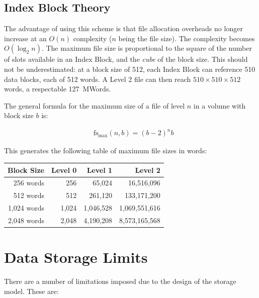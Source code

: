 \subsection{Index Block Theory}
\label{sec:index-block-theory}

The advantage of using this scheme is that file allocation overheads
no longer increase at an $O(n)$ complexity ($n$ being the file
size). The complexity becomes $O(\log_2 n)$. The maximum file size is
proportional to the square of the number of slots available in an
Index Block, and the {\em cube\/} of the block size. This should not
be underestimated: at a block size of 512, each Index Block can
reference 510 data blocks, each of 512 words. A Level 2 file can then
reach $510×510×512$ words, a respectable 127~MWords.

The general formula for the maximum size of a file of level $n$ in a
volume with block size $b$ is:

\begin{eqnarray}
& \mbox{fs}_{\max}(n, b) = (b - 2) ^ n b\nonumber
\end{eqnarray}

This generates the following table of maximum file sizes in words:

\begin{center}
\zebra
\begin{tabular}{rrrr}
Block Size & Level 0 & Level 1 & Level 2 \\
\hline
  256 words  &   256 &    65,024 &    16,516,096 \\
  512 words  &   512 &   261,120 &   133,171,200 \\
1,024 words  & 1,024 & 1,046,528 & 1,069,551,616 \\
2,048 words  & 2,048 & 4,190,208 & 8,573,165,568 \\
\hline
\end{tabular}
\end{center}

\section{Data Storage Limits}

There are a number of limitations imposed due to the design of the storage
model. These are:

